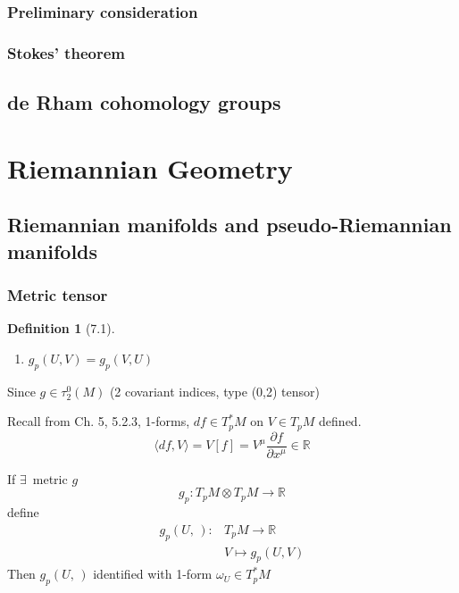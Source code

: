\documentclass[twoside]{amsart}
\newtheorem{definition}{Definition}
\begin{document}
\subsubsection{ Preliminary consideration }


\subsubsection{ Stokes' theorem }

\subsection{ de Rham cohomology groups }





\section{Riemannian Geometry}

\subsection{ Riemannian manifolds and pseudo-Riemannian manifolds }

\subsubsection{ Metric tensor }

\begin{definition}[7.1]
\begin{enumerate}
  \item[(i)] $  g_p(U,V) = g_p(V,U) $
\end{enumerate}
\end{definition}

Since $g \in \tau_2^0(M)$ (2 covariant indices, type (0,2) tensor)

Recall from Ch. 5, 5.2.3, 1-forms, 
$df \in T_p^* M$ on $V \in T_p M$ defined. 
\[
\langle df, V \rangle = V[f] = V^{\mu} \frac{ \partial f}{ \partial x^{\mu} } \in \mathbb{R}
\]

If $\exists \, $ metric $g$
\[
g_p : T_p M \otimes T_p M \to \mathbb{R}
\]
define
\[
\begin{aligned}
  g_p(U, \, ) : & T_p M \to \mathbb{R} \\
  & V \mapsto g_p(U,V)
\end{aligned}
\]
Then $g_p(U, \, )$ identified with 1-form $\omega_U \in T_p^*M$ 
\end{document}
